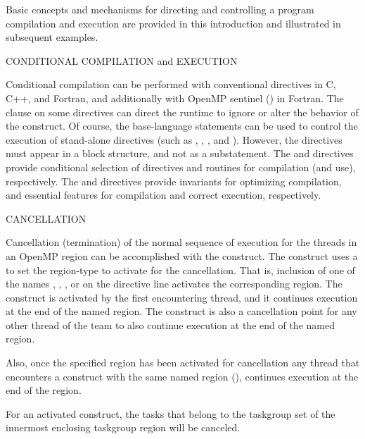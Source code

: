 \label{chap:program_control}

Basic concepts and mechanisms for directing and controlling a program compilation and execution
are provided in this introduction and illustrated in subsequent examples.

\bigskip
CONDITIONAL COMPILATION and EXECUTION

Conditional compilation can be performed with conventional  directives
in C, C++, and Fortran, and additionally with OpenMP sentinel (\scode{!$}) in Fortran. 
The  clause on some directives
can direct the runtime to ignore or alter the behavior of the construct.
Of course, the base-language  statements can be used to control the execution
of stand-alone directives (such as , , , 
and  ).
However, the directives must appear in a block structure, and not as a substatement.
The  and  directives provide conditional 
selection of directives and routines for compilation (and use), respectively.
The  and  directives provide invariants
for optimizing compilation, and essential features for compilation 
and correct execution, respectively.


\bigskip
CANCELLATION

Cancellation (termination) of the normal sequence of execution for the threads in an OpenMP region can
be  accomplished with the  construct.  The construct uses a
 to set the region-type to activate for the cancellation. 
That is, inclusion  of one of the  names , , 
,  or  on the directive line 
activates the corresponding region.  
The  construct is activated by the first encountering thread,  and it
continues execution at the end of the named region.
The  construct is also a cancellation point for any other thread of the team 
to also continue execution at the end of the named region.  

Also, once the specified region has been activated for cancellation any thread that encounters
a  construct with the same named region (),
continues execution at the end of the region.

For an activated  construct, the tasks that
belong to the taskgroup set of the innermost enclosing taskgroup region will be canceled. 

